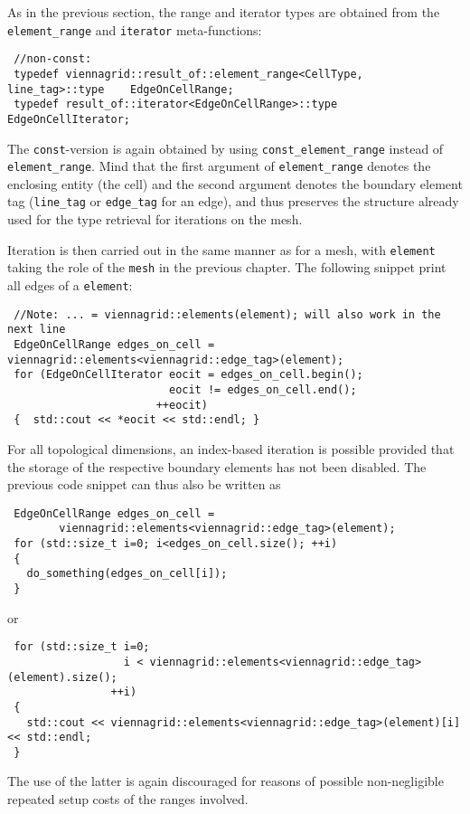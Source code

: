 
As in the previous section, the range and iterator types are obtained from the \lstinline|element_range| and \lstinline|iterator| meta-functions:
\begin{lstlisting}
 //non-const:
 typedef viennagrid::result_of::element_range<CellType, line_tag>::type    EdgeOnCellRange;
 typedef result_of::iterator<EdgeOnCellRange>::type                        EdgeOnCellIterator;
\end{lstlisting}
The \lstinline|const|-version is again obtained by using \lstinline|const_element_range| instead of \lstinline|element_range|.
Mind that the first argument of \lstinline|element_range| denotes the enclosing entity (the cell) and the second argument denotes the boundary element tag (\lstinline|line_tag| or \lstinline|edge_tag| for an edge), and thus preserves the structure already used for the type retrieval for iterations on the mesh.

Iteration is then carried out in the same manner as for a mesh, with \lstinline|element| taking the role of the \lstinline|mesh| in the previous chapter.
The following snippet print all edges of a \lstinline|element|:
\begin{lstlisting}
 //Note: ... = viennagrid::elements(element); will also work in the next line
 EdgeOnCellRange edges_on_cell = viennagrid::elements<viennagrid::edge_tag>(element);
 for (EdgeOnCellIterator eocit = edges_on_cell.begin();
                         eocit != edges_on_cell.end();
                       ++eocit)
 {  std::cout << *eocit << std::endl; }
\end{lstlisting}

For all topological dimensions, an index-based iteration is possible provided that the storage of the respective boundary elements has not been disabled. The previous code snippet can thus also be written as
\begin{lstlisting}
 EdgeOnCellRange edges_on_cell =
        viennagrid::elements<viennagrid::edge_tag>(element);
 for (std::size_t i=0; i<edges_on_cell.size(); ++i)
 {
   do_something(edges_on_cell[i]);
 }
\end{lstlisting}
or
\begin{lstlisting}
 for (std::size_t i=0;
                  i < viennagrid::elements<viennagrid::edge_tag>(element).size();
                ++i)
 {
   std::cout << viennagrid::elements<viennagrid::edge_tag>(element)[i] << std::endl;
 }
\end{lstlisting}
The use of the latter is again discouraged for reasons of possible non-negligible repeated setup costs of the ranges involved.

